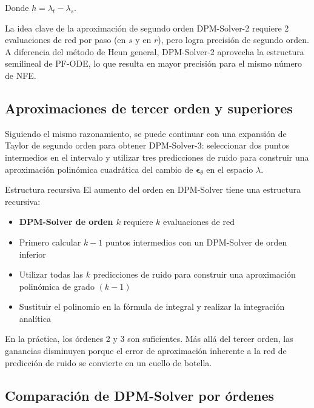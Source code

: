 \documentclass[a4paper]{article}
\begin{document}
Donde $h = \lambda_t - \lambda_s$.

\begin{importantbox}{La idea clave de la aproximación de segundo orden}
DPM-Solver-2 requiere 2 evaluaciones de red por paso (en $s$ y en $r$), pero logra precisión de segundo orden. A diferencia del método de Heun general, DPM-Solver-2 aprovecha la estructura semilineal de PF-ODE, lo que resulta en mayor precisión para el mismo número de NFE.
\end{importantbox}

\subsection{Aproximaciones de tercer orden y superiores}

Siguiendo el mismo razonamiento, se puede continuar con una expansión de Taylor de segundo orden para obtener DPM-Solver-3: seleccionar dos puntos intermedios en el intervalo y utilizar tres predicciones de ruido para construir una aproximación polinómica cuadrática del cambio de $\boldsymbol{\epsilon}_\theta$ en el espacio $\lambda$.

\begin{knowledgebox}{Estructura recursiva}
El aumento del orden en DPM-Solver tiene una estructura recursiva:
\begin{itemize}
    \item \textbf{DPM-Solver de orden $k$} requiere $k$ evaluaciones de red
    \item Primero calcular $k-1$ puntos intermedios con un DPM-Solver de orden inferior
    \item Utilizar todas las $k$ predicciones de ruido para construir una aproximación polinómica de grado $(k-1)$
    \item Sustituir el polinomio en la fórmula de integral y realizar la integración analítica
\end{itemize}
En la práctica, los órdenes 2 y 3 son suficientes. Más allá del tercer orden, las ganancias disminuyen porque el error de aproximación inherente a la red de predicción de ruido se convierte en un cuello de botella.
\end{knowledgebox}

\subsection{Comparación de DPM-Solver por órdenes}
\end{document}

